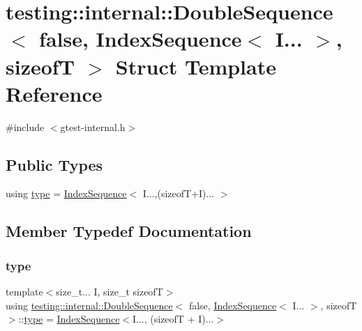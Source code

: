 \hypertarget{structtesting_1_1internal_1_1DoubleSequence_3_01false_00_01IndexSequence_3_01I_8_8_8_01_4_00_01sizeofT_01_4}{}\section{testing\+:\+:internal\+:\+:Double\+Sequence$<$ false, Index\+Sequence$<$ I... $>$, sizeofT $>$ Struct Template Reference}
\label{structtesting_1_1internal_1_1DoubleSequence_3_01false_00_01IndexSequence_3_01I_8_8_8_01_4_00_01sizeofT_01_4}


{\ttfamily \#include $<$gtest-\/internal.\+h$>$}

\subsection*{Public Types}
\begin{DoxyCompactItemize}
\item 
using \hyperlink{structtesting_1_1internal_1_1DoubleSequence_3_01false_00_01IndexSequence_3_01I_8_8_8_01_4_00_01sizeofT_01_4_af11568320fe19e984e2eb5ab9ad026aa}{type} = \hyperlink{structtesting_1_1internal_1_1IndexSequence}{Index\+Sequence}$<$ I...,(sizeofT+I)... $>$
\end{DoxyCompactItemize}


\subsection{Member Typedef Documentation}
\mbox{\label{structtesting_1_1internal_1_1DoubleSequence_3_01false_00_01IndexSequence_3_01I_8_8_8_01_4_00_01sizeofT_01_4_af11568320fe19e984e2eb5ab9ad026aa}} 
\subsubsection{\texorpdfstring{type}{type}}
{\footnotesize\ttfamily template$<$size\+\_\+t... I, size\+\_\+t sizeofT$>$ \\
using \hyperlink{structtesting_1_1internal_1_1DoubleSequence}{testing\+::internal\+::\+Double\+Sequence}$<$ false, \hyperlink{structtesting_1_1internal_1_1IndexSequence}{Index\+Sequence}$<$ I... $>$, sizeofT $>$\+::\hyperlink{structtesting_1_1internal_1_1DoubleSequence_3_01false_00_01IndexSequence_3_01I_8_8_8_01_4_00_01sizeofT_01_4_af11568320fe19e984e2eb5ab9ad026aa}{type} =  \hyperlink{structtesting_1_1internal_1_1IndexSequence}{Index\+Sequence}$<$I..., (sizeofT + I)...$>$}



